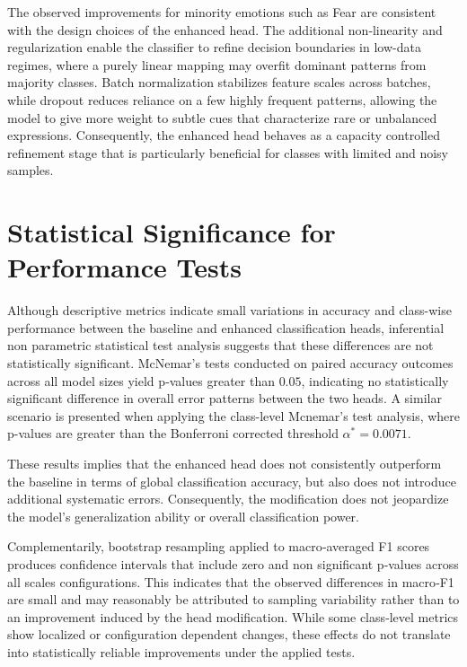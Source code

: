 The observed improvements for minority emotions such as Fear are consistent with the design choices of the enhanced head. The additional non‑linearity and regularization enable the classifier to refine decision boundaries in low-data regimes, where a purely linear mapping may overfit dominant patterns from majority classes. Batch normalization stabilizes feature scales across batches, while dropout reduces reliance on a few highly frequent patterns, allowing the model to give more weight to subtle cues that characterize rare or unbalanced expressions. Consequently, the enhanced head behaves as a capacity controlled refinement stage that is particularly beneficial for classes with limited and noisy samples.

\section{Statistical Significance for Performance Tests }

Although descriptive metrics indicate small variations in accuracy and class-wise performance between the baseline and enhanced classification heads, inferential non parametric statistical test analysis suggests that these differences are not statistically significant. McNemar’s tests conducted on paired accuracy outcomes across all model sizes yield p‑values greater than $0.05$, indicating no statistically significant difference in overall error patterns between the two heads. A similar scenario is presented when applying the class-level Mcnemar's test analysis, where p-values are greater than the Bonferroni corrected threshold $\alpha^* = 0.0071$.

These results implies that the enhanced head does not consistently outperform the baseline in terms of global classification accuracy, but also does not introduce additional systematic errors. Consequently, the modification does not jeopardize the model’s generalization ability or overall classification power.

Complementarily, bootstrap resampling applied to macro‑averaged F1 scores produces confidence intervals that include zero and non significant p‑values across all scales configurations. This indicates that the observed differences in macro‑F1 are small and may reasonably be attributed to sampling variability rather than to an improvement induced by the head modification. While some class‑level metrics show localized or configuration dependent changes, these effects do not translate into statistically reliable improvements under the applied tests.


